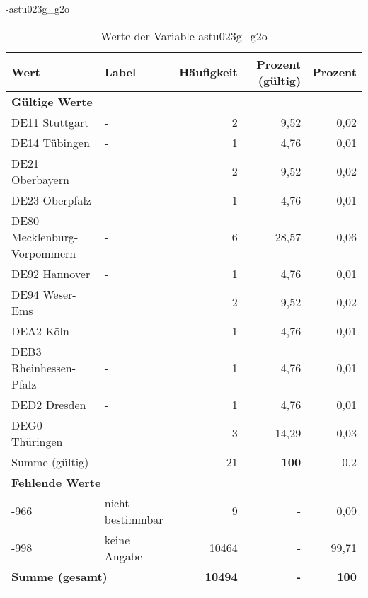                 \vspace*{-\baselineskip}
					\begin{filecontents}{\jobname-astu023g_g2o}
					\begin{longtable}{Xlrrr}
					\toprule
					\textbf{Wert} & \textbf{Label} & \textbf{Häufigkeit} & \textbf{Prozent (gültig)} & \textbf{Prozent} \\
					\endhead
					\midrule
					\multicolumn{5}{l}{\textbf{Gültige Werte}}\\

					\multicolumn{1}{X}{DE11 Stuttgart} &
					- &
					2 &
					9,52 &
					0,02 \\
					
					\multicolumn{1}{X}{DE14 Tübingen} &
					- &
					1 &
					4,76 &
					0,01 \\
					
					\multicolumn{1}{X}{DE21 Oberbayern} &
					- &
					2 &
					9,52 &
					0,02 \\
					
					\multicolumn{1}{X}{DE23 Oberpfalz} &
					- &
					1 &
					4,76 &
					0,01 \\
					
					\multicolumn{1}{X}{DE80 Mecklenburg-Vorpommern} &
					- &
					6 &
					28,57 &
					0,06 \\
					
					\multicolumn{1}{X}{DE92 Hannover} &
					- &
					1 &
					4,76 &
					0,01 \\
					
					\multicolumn{1}{X}{DE94 Weser-Ems} &
					- &
					2 &
					9,52 &
					0,02 \\
					
					\multicolumn{1}{X}{DEA2 Köln} &
					- &
					1 &
					4,76 &
					0,01 \\
					
					\multicolumn{1}{X}{DEB3 Rheinhessen-Pfalz} &
					- &
					1 &
					4,76 &
					0,01 \\
					
					\multicolumn{1}{X}{DED2 Dresden} &
					- &
					1 &
					4,76 &
					0,01 \\
					
					\multicolumn{1}{X}{DEG0 Thüringen} &
					- &
					3 &
					14,29 &
					0,03 \\
					\midrule
						\multicolumn{2}{l}{Summe (gültig)} & 21 &
						\textbf{100} &
					    0,2 \\
					\multicolumn{5}{l}{\textbf{Fehlende Werte}}\\
							-966 & nicht bestimmbar & 9 & - & 0,09 \\

							-998 & keine Angabe & 10464 & - & 99,71 \\

					\midrule
					\multicolumn{2}{l}{\textbf{Summe (gesamt)}} & \textbf{10494} & \textbf{-} & \textbf{100} \\
					\bottomrule
					\caption{Werte der Variable astu023g\_g2o}
					\end{longtable}
					\end{filecontents}


